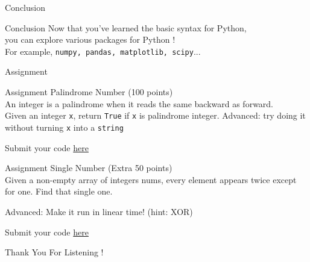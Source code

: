 \documentclass{beamer}
\begin{document}
    \begin{frame}[plain, c]
        \begin{center}
            \color{blue} \LARGE Conclusion
        \end{center}
    \end{frame}
    
    \begin{frame}{Conclusion}
        Now that you've learned the basic syntax for Python, \\
        you can explore various packages for Python ! \\
        For example, \texttt{numpy, pandas, matplotlib, scipy}... \\
        
    \end{frame}

    \begin{frame}[plain, c]
        \begin{center}
            \color{blue} \LARGE Assignment
        \end{center}
    \end{frame}

    \begin{frame}[fragile]{Assignment}
        \color{blue} \Large Palindrome Number (100 points)  \\
        \color{black} \normalsize \vskip 10pt
        An integer is a palindrome when it reads the same backward as forward. \\
        Given an integer \texttt{x}, return \texttt{True} if \texttt{x} is palindrome integer. \vskip 10pt
        Advanced: try doing it without turning \texttt{x} into a \texttt{string} \vskip 10pt

        Submit your code \href{https://leetcode.com/problems/palindrome-number/}{here}
    \end{frame}

    \begin{frame}[fragile]{Assignment}
        \color{blue} \Large Single Number (Extra 50 points)  \\
        \color{black} \normalsize \vskip 10pt
        Given a non-empty array of integers nums, 
        every element appears twice except for one. Find that single one. \vskip 10pt

        Advanced: Make it run in linear time! (hint: XOR) \vskip 10pt 

        Submit your code \href{https://leetcode.com/problems/single-number/}{here}
    \end{frame}
    
    \begin{frame}[plain, c]
        \begin{center}
            \color{blue} \LARGE Thank You For Listening !
        \end{center}
    \end{frame}
\end{document}
